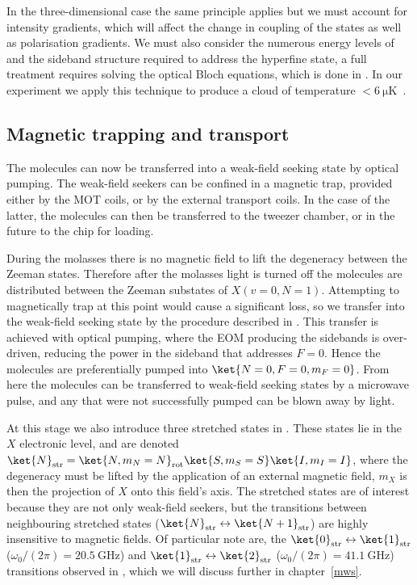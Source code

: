 In the three-dimensional case the same principle applies but we must account
for intensity gradients, which will affect the change in coupling of the states
as well as polarisation gradients. We must also consider the numerous energy
levels of \CaF{} and the sideband structure required to address the hyperfine
state, a full treatment requires solving the optical Bloch equations, which is
done in . In our experiment we apply this
technique to produce a \CaF{} cloud of temperature
$<\SI{6}{\micro\kelvin}$~\cite{PhysRevLett.123.033202}.

\subsection*{Magnetic trapping and transport}

The molecules can now be transferred into a weak-field seeking state by optical
pumping. The weak-field seekers can be confined in a magnetic trap, provided
either by the MOT coils, or by the external transport coils. In the case of the
latter, the molecules can then be transferred to the tweezer chamber, or in the
future to the chip for loading.

During the molasses there is no magnetic field to lift the degeneracy between
the Zeeman states. Therefore after the molasses light is turned off the
molecules are distributed between the Zeeman substates of $X(v=0, N=1)$.
Attempting to magnetically trap at this point would cause a significant loss,
so we transfer into the weak-field seeking state by the procedure described in
. This transfer is achieved with optical
pumping, where the EOM producing the  sidebands is over-driven,
reducing the power in the sideband that addresses $F=0$. Hence the molecules
are preferentially pumped into $\ket{N=0, F=0, m_F=0}$. From here the molecules can 
be transferred to weak-field seeking states by a microwave pulse, and any that
were not successfully pumped can be blown away by  light.

At this stage we also introduce three stretched states in \CaF{}. These states
lie in the $X$ electronic level, and are denoted $\ket{N}_\text{str} = \ket{N,
m_N=N}_\text{rot}\ket{S, m_S=S}\ket{I,m_I=I}$, where the degeneracy must be
lifted by the application of an external magnetic field, $m_X$ is then the
projection of $X$ onto this field's axis. The stretched states are of interest
because they are not only weak-field seekers, but the transitions between
neighbouring stretched states
($\ket{N}_\text{str}\leftrightarrow\ket{N+1}_\text{str}$) are highly
insensitive to magnetic fields. Of particular note are, the
$\ket{0}_\text{str}\leftrightarrow\ket{1}_\text{str}$ ($\omega_0/(2\pi) =
\SI{20.5}{\giga\hertz}$) and
$\ket{1}_\text{str}\leftrightarrow\ket{2}_\text{str}$ ($\omega_0/(2\pi) =
\SI{41.1}{\giga\hertz}$) transitions observed in
, which we will discuss further in
chapter~\ref{mws}.

